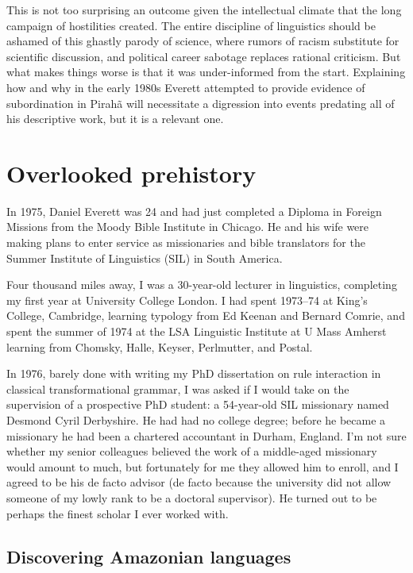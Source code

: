 \documentclass[output=paper,colorlinks,citecolor=brown
]{langscibook}
\begin{document}
This is not too surprising an outcome given the intellectual climate
that the long campaign of hostilities created. The entire discipline
of linguistics should be ashamed of this ghastly parody of science,
where rumors of racism substitute for scientific discussion, and
political career sabotage replaces rational criticism. But what makes
things worse is that it was under-informed from the start. Explaining
how and why in the early 1980s Everett attempted to provide evidence
of subordination in Pirah{\~a} will necessitate a digression into
events predating all of his descriptive work, but it is a relevant
one.

\section{Overlooked prehistory}\label{prehistory}

In 1975, Daniel Everett was 24 and had just completed a Diploma
in Foreign Missions from the Moody Bible Institute in Chicago. He and
his wife were making plans to enter service as missionaries and bible
translators for the Summer Institute of Linguistics (SIL) in South
America.

Four thousand miles away, I was a 30-year-old lecturer in linguistics,
completing my first year at University College London. I had spent
1973--74 at King's College, Cambridge, learning typology from Ed
Keenan and Bernard Comrie, and spent the summer of 1974 at the LSA
Linguistic Institute at U Mass Amherst learning from Chomsky, Halle,
Keyser, Perlmutter, and Postal.

In 1976, barely done with writing my PhD dissertation on rule interaction
in classical transformational grammar, I was asked if I would take
on the supervision of a prospective PhD student: a 54-year-old SIL
missionary named Desmond Cyril Derbyshire. He had had no college
degree; before he became a missionary he had been a chartered
accountant in Durham, England. I'm not sure whether my senior colleagues
believed the work of a middle-aged missionary would amount to much, but
fortunately for me they allowed him to enroll, and I agreed to be his
de facto advisor (de facto because the university did not allow someone
of my lowly rank to be a doctoral supervisor). He turned out to be
perhaps the finest scholar I ever worked with.

\subsection{Discovering Amazonian languages}
\label{sec-discovering-amazonian}
\end{document}
